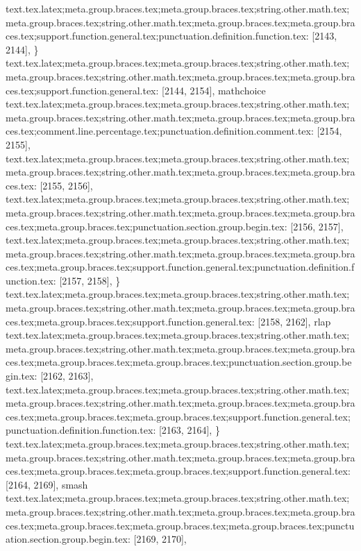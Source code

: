 {{{{{{{{{{{{{{{{{{{{{{{{{{{{{{{{{{{{{{{{{{{{{{{{{{{{{{{{text.tex.latex;meta.group.braces.tex;meta.group.braces.tex;string.other.math.tex;meta.group.braces.tex;string.other.math.tex;meta.group.braces.tex;meta.group.braces.tex;support.function.general.tex;punctuation.definition.function.tex: [2143, 2144], {\}
text.tex.latex;meta.group.braces.tex;meta.group.braces.tex;string.other.math.tex;meta.group.braces.tex;string.other.math.tex;meta.group.braces.tex;meta.group.braces.tex;support.function.general.tex: [2144, 2154], {mathchoice}
text.tex.latex;meta.group.braces.tex;meta.group.braces.tex;string.other.math.tex;meta.group.braces.tex;string.other.math.tex;meta.group.braces.tex;meta.group.braces.tex;comment.line.percentage.tex;punctuation.definition.comment.tex: [2154, 2155], {%
text.tex.latex;meta.group.braces.tex;meta.group.braces.tex;string.other.math.tex;meta.group.braces.tex;string.other.math.tex;meta.group.braces.tex;meta.group.braces.tex: [2155, 2156], {
}
text.tex.latex;meta.group.braces.tex;meta.group.braces.tex;string.other.math.tex;meta.group.braces.tex;string.other.math.tex;meta.group.braces.tex;meta.group.braces.tex;meta.group.braces.tex;punctuation.section.group.begin.tex: [2156, 2157], {{}
text.tex.latex;meta.group.braces.tex;meta.group.braces.tex;string.other.math.tex;meta.group.braces.tex;string.other.math.tex;meta.group.braces.tex;meta.group.braces.tex;meta.group.braces.tex;support.function.general.tex;punctuation.definition.function.tex: [2157, 2158], {\}
text.tex.latex;meta.group.braces.tex;meta.group.braces.tex;string.other.math.tex;meta.group.braces.tex;string.other.math.tex;meta.group.braces.tex;meta.group.braces.tex;meta.group.braces.tex;support.function.general.tex: [2158, 2162], {rlap}
text.tex.latex;meta.group.braces.tex;meta.group.braces.tex;string.other.math.tex;meta.group.braces.tex;string.other.math.tex;meta.group.braces.tex;meta.group.braces.tex;meta.group.braces.tex;meta.group.braces.tex;punctuation.section.group.begin.tex: [2162, 2163], {{}
text.tex.latex;meta.group.braces.tex;meta.group.braces.tex;string.other.math.tex;meta.group.braces.tex;string.other.math.tex;meta.group.braces.tex;meta.group.braces.tex;meta.group.braces.tex;meta.group.braces.tex;support.function.general.tex;punctuation.definition.function.tex: [2163, 2164], {\}
text.tex.latex;meta.group.braces.tex;meta.group.braces.tex;string.other.math.tex;meta.group.braces.tex;string.other.math.tex;meta.group.braces.tex;meta.group.braces.tex;meta.group.braces.tex;meta.group.braces.tex;support.function.general.tex: [2164, 2169], {smash}
text.tex.latex;meta.group.braces.tex;meta.group.braces.tex;string.other.math.tex;meta.group.braces.tex;string.other.math.tex;meta.group.braces.tex;meta.group.braces.tex;meta.group.braces.tex;meta.group.braces.tex;meta.group.braces.tex;punctuation.section.group.begin.tex: [2169, 2170], {{}
}}}}}}}}}}}}}}}}}}}}}}}}}}}}}}}}}}}}}}}}}}}}}}}}}}}}}}}}}}}}}}}
